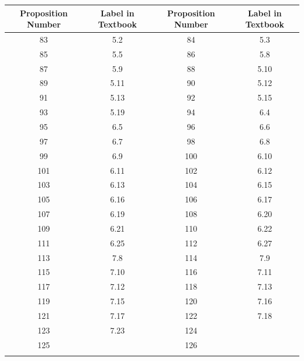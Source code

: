 \documentclass{book}
\newenvironment{allowTableDashes}{\ADLactivate}{\ADLinactivate}
\newcommand{\myVS}{\vphantom{$\int_a^b$}}
\begin{document}
\begin{allowTableDashes}
   \begin{tabular}{ c|c||c|c }
      Proposition Number & Label in Textbook & Proposition Number & Label in Textbook \\ \hline
      
      \myVS 83 & 5.2 & 84 & 5.3 \\ \hdashline[10pt/3pt]
      \myVS 85 & 5.5 & 86 & 5.8 \\ \hdashline[10pt/3pt]
      \myVS 87 & 5.9  & 88 & 5.10 \\ \hdashline[10pt/3pt]
      \myVS 89 & 5.11 & 90 & 5.12 \\ \hdashline[10pt/3pt]
      \myVS 91 & 5.13 & 92 & 5.15 \\ \hdashline[10pt/3pt]
      \myVS 93 & 5.19 & 94 & 6.4  \\ \hdashline[10pt/3pt]
      \myVS 95 & 6.5 & 96 & 6.6 \\ \hdashline[10pt/3pt]
      \myVS 97 & 6.7 & 98 & 6.8 \\ \hdashline[10pt/3pt]
      \myVS 99 & 6.9 & 100 & 6.10 \\ \hdashline[10pt/3pt]
      \myVS 101 & 6.11 & 102 & 6.12 \\ \hdashline[10pt/3pt]
      \myVS 103 & 6.13 & 104 & 6.15 \\ \hdashline[10pt/3pt]
      \myVS 105 & 6.16 & 106 & 6.17 \\ \hdashline[10pt/3pt]
      \myVS 107 & 6.19 & 108 & 6.20 \\ \hdashline[10pt/3pt]
      \myVS 109 & 6.21 & 110 & 6.22 \\ \hdashline[10pt/3pt]
      \myVS 111 & 6.25 & 112 & 6.27 \\ \hdashline[10pt/3pt]
      \myVS 113 & 7.8 & 114 & 7.9 \\ \hdashline[10pt/3pt]
      \myVS 115 & 7.10 & 116 & 7.11 \\ \hdashline[10pt/3pt]
      \myVS 117 & 7.12 & 118 & 7.13 \\ \hdashline[10pt/3pt]
      \myVS 119 & 7.15 & 120 & 7.16 \\ \hdashline[10pt/3pt]
      \myVS 121 & 7.17 & 122 & 7.18 \\ \hdashline[10pt/3pt]
      \myVS 123 & 7.23 & 124 &  \\ \hdashline[10pt/3pt]
      \myVS 125 &  & 126 &  \\ \hdashline[10pt/3pt]
   \end{tabular}

\end{allowTableDashes}
\end{document}
